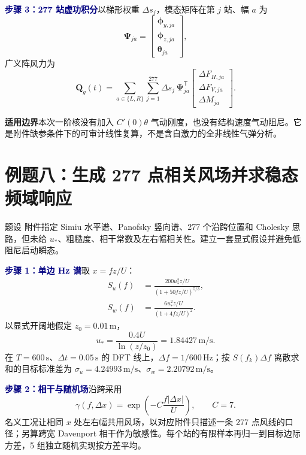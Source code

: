 \documentclass[11pt,a4paper]{article}
\newcommand{\T}{\mathsf{T}}
\newcommand{\Step}[1]{\par\medskip\noindent\textcolor{Navy}{\bfseries 步骤 #1}\quad}
\newcommand{\Scope}{\par\medskip\noindent\textcolor{Warn}{\bfseries 适用边界}\quad}
\begin{document}
\Step{3：277 站虚功积分}以梯形权重 $\Delta s_j$，模态矩阵在第 $j$ 站、幅 $a$ 为
\begin{equation}
\bm\Psi_{ja}=
\begin{bmatrix}
\bm\phi_{y,ja}\\ \bm\phi_{z,ja}\\ \bm\theta_{ja}
\end{bmatrix},
\end{equation}
广义阵风力为
\begin{equation}
\boxed{\bm Q_g(t)=\sum_{a\in\{L,R\}}\sum_{j=1}^{277}
\Delta s_j\,\bm\Psi_{ja}^{\T}
\begin{bmatrix}\Delta F_{H,ja}\\\Delta F_{V,ja}\\\Delta M_{ja}\end{bmatrix}}.
\end{equation}

\Scope 本次一阶核没有加入 $C'(0)\theta$ 气动刚度，也没有结构速度气动阻尼。它是附件缺参条件下的可审计线性复算，不是含自激力的全非线性气弹分析。

\section{例题八：生成 277 点相关风场并求稳态频域响应}
\begin{problem}{题设}
附件指定 Simiu 水平谱、Panofsky 竖向谱、277 个沿跨位置和 Cholesky 思路，但未给 $u_*$、粗糙度、相干常数及左右幅相关性。建立一套显式假设并避免低阻尼启动瞬态。
\end{problem}

\Step{1：单边 Hz 谱}取 $x=fz/U$：
\begin{align}
S_u(f)&=\frac{200u_*^2z/U}{(1+50fz/U)^{5/3}},\\
S_w(f)&=\frac{6u_*^2z/U}{(1+4fz/U)^2}.
\end{align}
以显式开阔地假定 $z_0=0.01\,\mathrm m$，
\begin{equation}
u_*=\frac{0.4U}{\ln(z/z_0)}=1.84427\,\mathrm{m/s}.
\end{equation}
在 $T=600\,\mathrm s$、$\Delta t=0.05\,\mathrm s$ 的 DFT 线上，$\Delta f=1/600\,\mathrm{Hz}$；按 $S(f_k)\Delta f$ 离散求和的目标标准差为 $\sigma_u=4.24993\,\mathrm{m/s}$、$\sigma_w=2.20792\,\mathrm{m/s}$。

\Step{2：相干与随机场}沿跨采用
\begin{equation}
\gamma(f,\Delta x)=\exp\!\left(-C\frac{f|\Delta x|}{U}\right),\qquad C=7.
\end{equation}
名义工况让相同 $x$ 处左右幅共用风场，以对应附件只描述一条 277 点风线的口径；另算跨宽 Davenport 相干作为敏感性。每个站的有限样本再归一到目标边际方差，5 组独立随机实现按方差平均。
\end{document}

